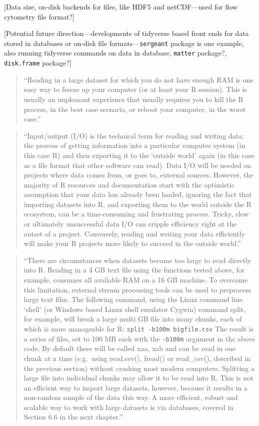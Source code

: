 \documentclass[]{tufte-book}
\begin{document}
{[}Data size, on-disk backends for files, like HDF5 and netCDF---used for flow
cytometry file format?{]}

{[}Potential future direction---developments of tidyverse based front ends for
data stored in databases or on-disk file formats---\texttt{sergeant} package is one
example, also running tidyverse commands on data in database, \texttt{matter} package?,
\texttt{disk.frame} package?{]}

\begin{quote}
``Reading in a large dataset for which you do not have enough RAM is one easy way to freeze up your computer (or at least your R session). This is usually an unpleasant experience that usually requires you to kill the R process, in the best case scenario, or reboot your computer, in the worst case.'' \citep{peng2016r}
\end{quote}

\begin{quote}
``Input/output (I/O) is the technical term for reading and writing data: the process of getting information into a particular computer system (in this case R) and then exporting it to the `outside world' again (in this case as a file format that other software can read). Data I/O will be needed on projects where data comes from, or goes to, external sources. However, the majority of R resources and documentation start with the optimistic assumption that your data has already been loaded, ignoring the fact that importing datasets into R, and exporting them to the world outside the R ecosystem, can be a time-consuming and frustrating process. Tricky, slow or ultimately unsuccessful data I/O can cripple efficiency right at the outset of a project. Conversely, reading and writing your data efficiently will make your R projects more likely to succeed in the outside world.'' \citep{gillespie2016efficient}
\end{quote}

\begin{quote}
``There are circumstances when datasets become too large to read directly into
R. Reading in a 4 GB text file using the functions tested above, for example,
consumes all available RAM on a 16 GB machine. To overcome this limitation,
external stream processing tools can be used to preprocess large text files. The
following command, using the Linux command line `shell' (or Windows based Linux
shell emulator Cygwin) command split, for example, will break a large multi GB
file into many chunks, each of which is more manageable for R: \texttt{split\ -b100m\ bigfile.csv} The result is a series of files, set to 100 MB each with the
\texttt{-b100m} argument in the above code. By default these will be called xaa, xab
and can be read in one chunk at a time (e.g.~using read.csv(), fread() or
read\_csv(), described in the previous section) without crashing most modern
computers. Splitting a large file into individual chunks may allow it to be read
into R. This is not an efficient way to import large datasets, however, because
it results in a non-random sample of the data this way. A more efficient, robust
and scalable way to work with large datasets is via databases, covered in
Section 6.6 in the next chapter.'' \citep{gillespie2016efficient}
\end{quote}
\end{document}
